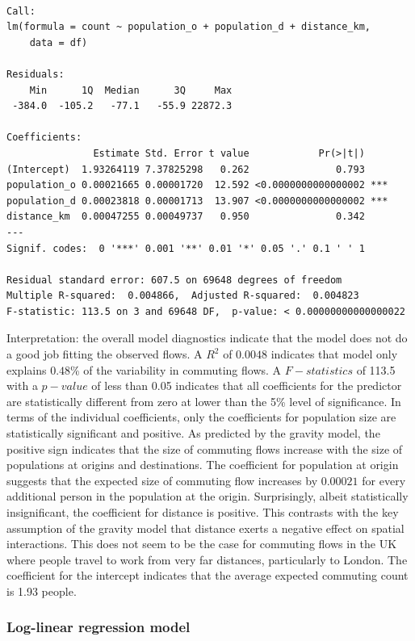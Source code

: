 \documentclass[
  a4paper, 
  twoside,
  final
]{article}
\newcounter{code}
\begin{document}
\begin{verbatim}

Call:
lm(formula = count ~ population_o + population_d + distance_km, 
    data = df)

Residuals:
    Min      1Q  Median      3Q     Max 
 -384.0  -105.2   -77.1   -55.9 22872.3 

Coefficients:
               Estimate Std. Error t value            Pr(>|t|)    
(Intercept)  1.93264119 7.37825298   0.262               0.793    
population_o 0.00021665 0.00001720  12.592 <0.0000000000000002 ***
population_d 0.00023818 0.00001713  13.907 <0.0000000000000002 ***
distance_km  0.00047255 0.00049737   0.950               0.342    
---
Signif. codes:  0 '***' 0.001 '**' 0.01 '*' 0.05 '.' 0.1 ' ' 1

Residual standard error: 607.5 on 69648 degrees of freedom
Multiple R-squared:  0.004866,  Adjusted R-squared:  0.004823 
F-statistic: 113.5 on 3 and 69648 DF,  p-value: < 0.00000000000000022
\end{verbatim}

Interpretation: the overall model diagnostics indicate that the model
does not do a good job fitting the observed flows. A \(R^{2}\) of
\(0.0048\) indicates that model only explains \(0.48\)\% of the
variability in commuting flows. A \(F-statistics\) of 113.5 with a
\(p-value\) of less than 0.05 indicates that all coefficients for the
predictor are statistically different from zero at lower than the 5\%
level of significance. In terms of the individual coefficients, only the
coefficients for population size are statistically significant and
positive. As predicted by the gravity model, the positive sign indicates
that the size of commuting flows increase with the size of populations
at origins and destinations. The coefficient for population at origin
suggests that the expected size of commuting flow increases by
\(0.00021\) for every additional person in the population at the origin.
Surprisingly, albeit statistically insignificant, the coefficient for
distance is positive. This contrasts with the key assumption of the
gravity model that distance exerts a negative effect on spatial
interactions. This does not seem to be the case for commuting flows in
the UK where people travel to work from very far distances, particularly
to London. The coefficient for the intercept indicates that the average
expected commuting count is 1.93 people.

\hypertarget{log-linear-regression-model}{%
\subsubsection{Log-linear regression
model}\label{log-linear-regression-model}}
\end{document}
